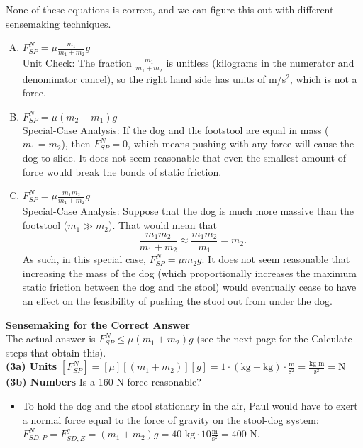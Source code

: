 \documentclass[]{article}
\begin{document}
\newpage
\begin{TeacherMargin}
\noindent None of these equations is correct, and we can figure this out with different sensemaking techniques.
\begin{enumerate}[(A)]
	\item $F^{N}_{SP} = \mu\frac{m_{1}}{m_{1}+m_{2}}g$ \\
	Unit Check: The fraction $\frac{m_{1}}{m_{1}+m_{2}}$ is unitless (kilograms in the numerator and denominator cancel), so the right hand side has units of m/s$^{2}$, which is not a force.
	\item $F^{N}_{SP} = \mu(m_{2}-m_{1})g$ \\
	Special-Case Analysis: If the dog and the footstool are equal in mass ($m_{1}=m_{2}$), then $F^{N}_{SP} = 0$, which means pushing with any force will cause the dog to slide. It does not seem reasonable that even the smallest amount of force would break the bonds of static friction.
	\item $F^{N}_{SP} = \mu\frac{m_{1}m_{2}}{m_{1}+m_{2}}g$ \\
	Special-Case Analysis: Suppose that the dog is much more massive than the footstool ($m_{1} \gg m_{2}$). That would mean that
	\[
	\frac{m_{1}m_{2}}{m_{1}+m_{2}} \approx \frac{m_{1}m_{2}}{m_{1}} = m_{2}.
	\]
	As such, in this special case, $F^{N}_{SP} = \mu m_{2}g$. It does not seem reasonable that increasing the mass of the dog (which proportionally increases the maximum static friction between the dog and the stool) would eventually cease to have an effect on the feasibility of pushing the stool out from under the dog.
\end{enumerate}
\textbf{Sensemaking for the Correct Answer} \\
The actual answer is $F^{N}_{SP} \leq \mu(m_{1}+m_{2})g$ (see the next page for the Calculate steps that obtain this). \\
\noindent\textbf{(3a) Units} $\left[F^{N}_{SP}\right] = \left[\mu\right]\left[(m_{1}+m_{2})\right]\left[g\right] = 1 \cdot (\text{kg}+\text{kg}) \cdot \frac{\text{m}}{\text{s}^{2}} = \frac{\text{kg m}}{\text{s}^{2}} = \text{N}$ \\
\textbf{(3b) Numbers} Is a 160 N force reasonable?
\begin{itemize}
	\item To hold the dog and the stool stationary in the air, Paul would have to exert a normal force equal to the force of gravity on the stool-dog system: $F^{N}_{SD,P} = F^{g}_{SD,E} = (m_{1}+m_{2})g = 40\text{ kg} \cdot 10\frac{\text{m}}{\text{s}^{2}} = 400\text{ N}$. \\

\end{itemize}
\end{TeacherMargin}
\end{document}
